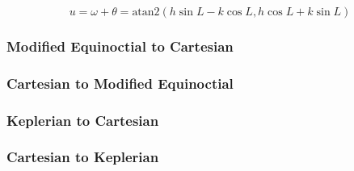\begin{equation}
    u = \omega+\theta = \textrm{atan2}(h\sin{L}-k\cos{L},h\cos{L}+k\sin{L})
\end{equation}

\subsubsection*{Modified Equinoctial to Cartesian\label{mee2rec}}

\subsubsection*{Cartesian to Modified Equinoctial\label{rec2mee}}

\subsubsection*{Keplerian to Cartesian\label{kep2rec}}

\subsubsection*{Cartesian to Keplerian\label{rec2kep}}

